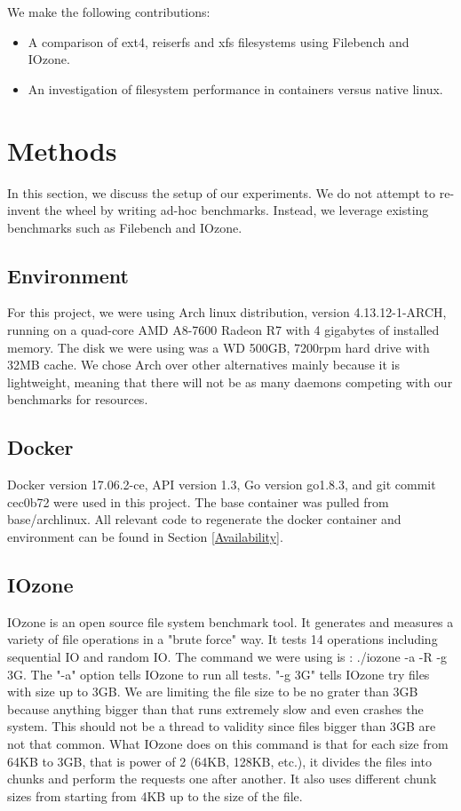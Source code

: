 \documentclass[letterpaper,twocolumn,10pt]{article}
\begin{document}
We make the following contributions:
\begin{itemize}
  \item A comparison of ext4, reiserfs and xfs filesystems using Filebench and IOzone.
  \item An investigation of filesystem performance in containers versus native linux.
\end{itemize}

\section{Methods}
In this section, we discuss the setup of our experiments. We do not attempt to re-invent the wheel by writing ad-hoc benchmarks. Instead, we leverage existing benchmarks such as Filebench and IOzone.

\subsection{Environment}
For this project, we were using Arch linux distribution, version 4.13.12-1-ARCH, running on a quad-core AMD A8-7600 Radeon R7 with 4 gigabytes of installed memory. The disk we were using was a WD 500GB, 7200rpm hard drive with 32MB cache. We chose Arch over other alternatives mainly because it is lightweight, meaning that there will not be as many daemons competing with our benchmarks for resources.

\subsection{Docker}
Docker version 17.06.2-ce, API version 1.3, Go version go1.8.3, and git commit cec0b72 were used in this project. The base container was pulled from base/archlinux. All relevant code to regenerate the docker container and environment can be found in Section \ref{Availability}.

\subsection{IOzone}
IOzone is an open source file system benchmark tool. It generates and measures a variety of file operations in a "brute force" way. It tests 14 operations including sequential IO and random IO. The command we were using is : ./iozone -a -R -g 3G. The "-a" option tells IOzone to run all tests. "-g 3G" tells IOzone try files with size up to 3GB. We are limiting the file size to be no grater than 3GB because anything bigger than that runs extremely slow and even crashes the system. This should not be a thread to validity since files bigger than 3GB are not that common. What IOzone does on this command is that for each size from 64KB to 3GB, that is power of 2 (64KB, 128KB, etc.), it divides the  files into chunks and perform the requests one after another. It also uses different chunk sizes from starting from 4KB up to the size of the file. 
\end{document}
